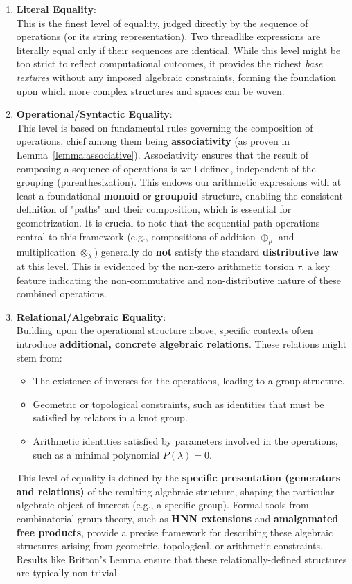 \begin{enumerate}
    \item \textbf{Literal Equality}: \\
    This is the finest level of equality, judged directly by the sequence of operations (or its string representation). Two threadlike expressions are literally equal only if their sequences are identical. While this level might be too strict to reflect computational outcomes, it provides the richest \emph{base textures} without any imposed algebraic constraints, forming the foundation upon which more complex structures and spaces can be woven.

    \item \textbf{Operational/Syntactic Equality}: \\
    This level is based on fundamental rules governing the composition of operations, chief among them being \textbf{associativity} (as proven in Lemma~\ref{lemma:associative}). Associativity ensures that the result of composing a sequence of operations is well-defined, independent of the grouping (parenthesization). This endows our arithmetic expressions with at least a foundational \textbf{monoid} or \textbf{groupoid} structure, enabling the consistent definition of "paths" and their composition, which is essential for geometrization. It is crucial to note that the sequential path operations central to this framework (e.g., compositions of addition $\oplus_\mu$ and multiplication $\otimes_\lambda$) generally do \textbf{not} satisfy the standard \textbf{distributive law} at this level. This is evidenced by the non-zero arithmetic torsion $\tau$, a key feature indicating the non-commutative and non-distributive nature of these combined operations.

    \item \textbf{Relational/Algebraic Equality}: \\
    Building upon the operational structure above, specific contexts often introduce \textbf{additional, concrete algebraic relations}. These relations might stem from:
    \begin{itemize}
        \item The existence of inverses for the operations, leading to a group structure.
        \item Geometric or topological constraints, such as identities that must be satisfied by relators in a knot group.
        \item Arithmetic identities satisfied by parameters involved in the operations, such as a minimal polynomial $P(\lambda)=0$.
    \end{itemize}
    This level of equality is defined by the \textbf{specific presentation (generators and relations)} of the resulting algebraic structure, shaping the particular algebraic object of interest (e.g., a specific group). Formal tools from combinatorial group theory, such as \textbf{HNN extensions} and \textbf{amalgamated free products}, provide a precise framework for describing these algebraic structures arising from geometric, topological, or arithmetic constraints. Results like Britton's Lemma ensure that these relationally-defined structures are typically non-trivial.


\end{enumerate}
